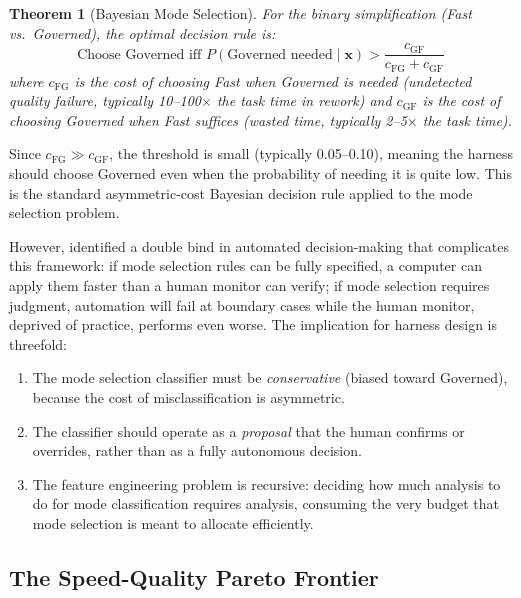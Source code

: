 \documentclass[11pt, a4paper, logo, copyright]{googledeepmind}
\newtheorem{theorem}{Theorem}[section]
\begin{document}
\begin{theorem}[Bayesian Mode Selection]
\label{thm:bayesian-mode}
For the binary simplification (Fast vs.\ Governed), the optimal decision rule is:
\begin{equation}
    \text{Choose Governed iff } P(\text{Governed needed} \mid \mathbf{x}) > \frac{c_{\mathrm{GF}}}{c_{\mathrm{FG}} + c_{\mathrm{GF}}}
\end{equation}
where $c_{\mathrm{FG}}$ is the cost of choosing Fast when Governed is needed (undetected quality failure, typically 10--100$\times$ the task time in rework) and $c_{\mathrm{GF}}$ is the cost of choosing Governed when Fast suffices (wasted time, typically 2--5$\times$ the task time).
\end{theorem}

Since $c_{\mathrm{FG}} \gg c_{\mathrm{GF}}$, the threshold is small (typically 0.05--0.10), meaning the harness should choose Governed even when the probability of needing it is quite low. This is the standard asymmetric-cost Bayesian decision rule applied to the mode selection problem.

However, \citet{bainbridge1983ironies} identified a double bind in automated decision-making that complicates this framework: if mode selection rules can be fully specified, a computer can apply them faster than a human monitor can verify; if mode selection requires judgment, automation will fail at boundary cases while the human monitor, deprived of practice, performs even worse. The implication for harness design is threefold:

\begin{enumerate}[nosep]
    \item The mode selection classifier must be \emph{conservative} (biased toward Governed), because the cost of misclassification is asymmetric.
    \item The classifier should operate as a \emph{proposal} that the human confirms or overrides, rather than as a fully autonomous decision.
    \item The feature engineering problem is recursive: deciding how much analysis to do for mode classification requires analysis, consuming the very budget that mode selection is meant to allocate efficiently.
\end{enumerate}

\subsection{The Speed-Quality Pareto Frontier}
\end{document}
